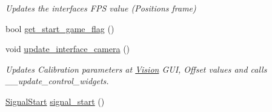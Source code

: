 \begin{DoxyCompactItemize}
\begin{DoxyCompactList}\small\item\em Updates the interface\textquotesingle{}s F\+PS value (Positions frame) \end{DoxyCompactList}\item 
bool \hyperlink{class_v_s_s_s___g_u_i_1_1_v4_l_interface_afb1f877ebf3a82de783f6860979eea85}{get\+\_\+start\+\_\+game\+\_\+flag} ()
\item 
void \hyperlink{class_v_s_s_s___g_u_i_1_1_v4_l_interface_a13ef172ecb7af3eb140f686b02a80662}{update\+\_\+interface\+\_\+camera} ()
\begin{DoxyCompactList}\small\item\em Updates Calibration parameters at \hyperlink{class_vision}{Vision} G\+UI, Offset values and calls \+\_\+\+\_\+update\+\_\+control\+\_\+widgets. \end{DoxyCompactList}\item 
\hyperlink{class_v_s_s_s___g_u_i_1_1_v4_l_interface_aaa97121c9564dbb8c0717725a795ed15}{Signal\+Start} \hyperlink{class_v_s_s_s___g_u_i_1_1_v4_l_interface_a43220e7911fcf933c7e2e702b703943e}{signal\+\_\+start} ()
\end{DoxyCompactItemize}
